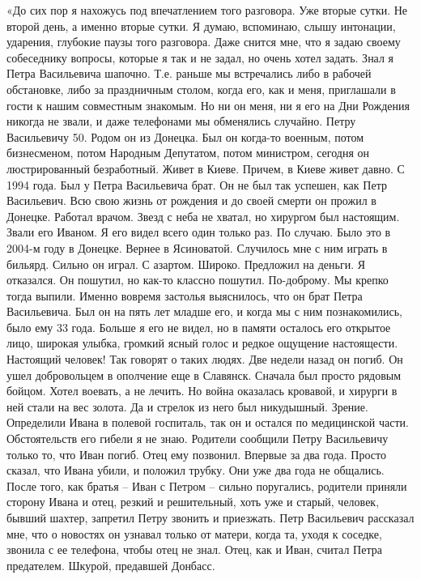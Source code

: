  «До сих пор я нахожусь под впечатлением того разговора. Уже вторые сутки. Не второй день, а именно вторые сутки. Я думаю, вспоминаю, слышу интонации, ударения, глубокие паузы того разговора. Даже снится мне, что я задаю своему собеседнику вопросы, которые я так и не задал, но очень хотел задать. 
Знал я Петра Васильевича шапочно. Т.е. раньше мы встречались либо в рабочей обстановке, либо за праздничным столом, когда его, как и меня, приглашали в гости к нашим совместным знакомым. Но ни он меня, ни я его на Дни Рождения никогда не звали, и даже телефонами мы обменялись случайно. 
Петру Васильевичу 50. Родом он из Донецка. Был он когда-то военным, потом бизнесменом, потом Народным Депутатом, потом министром, сегодня он люстрированный безработный. Живет в Киеве. Причем, в Киеве живет давно. С 1994 года. 
Был у Петра Васильевича брат. Он не был так успешен, как Петр Васильевич. Всю свою жизнь от рождения и до своей смерти он прожил в Донецке. Работал врачом. Звезд с неба не хватал, но хирургом был настоящим. Звали его Иваном. Я его видел всего один только раз. По случаю. 
Было это в 2004-м году в Донецке. Вернее в Ясиноватой. Случилось мне с ним играть в бильярд. Сильно он играл. С азартом. Широко. Предложил на деньги. Я отказался. Он пошутил, но как-то классно пошутил. По-доброму. Мы крепко тогда выпили. Именно вовремя застолья выяснилось, что он брат Петра Васильевича. Был он на пять  лет младше его, и когда мы с ним познакомились, было ему 33 года.
Больше я его не видел, но в памяти осталось его открытое лицо, широкая улыбка, громкий ясный голос и редкое ощущение настоящести. Настоящий человек! Так говорят о таких людях. 
Две недели назад он погиб. Он ушел добровольцем в ополчение еще в Славянск. Сначала был просто рядовым бойцом. Хотел воевать, а не лечить. Но война оказалась кровавой, и хирурги в ней стали на вес золота. Да и стрелок из него был никудышный. Зрение. Определили Ивана в полевой госпиталь, так он и остался по медицинской части. 
Обстоятельств его гибели я не знаю. Родители сообщили Петру Васильевичу только то, что Иван погиб. Отец ему позвонил. Впервые за два года. Просто сказал, что Ивана убили, и положил трубку. Они уже два года не общались. После того, как братья – Иван с Петром – сильно поругались, родители приняли сторону Ивана и отец, резкий и решительный, хоть уже и старый, человек, бывший шахтер, запретил Петру звонить и приезжать. Петр Васильевич рассказал мне, что о новостях он узнавал только от матери, когда та, уходя к соседке, звонила с ее телефона, чтобы отец не знал. Отец, как и Иван, считал Петра предателем. Шкурой, предавшей Донбасс. 
